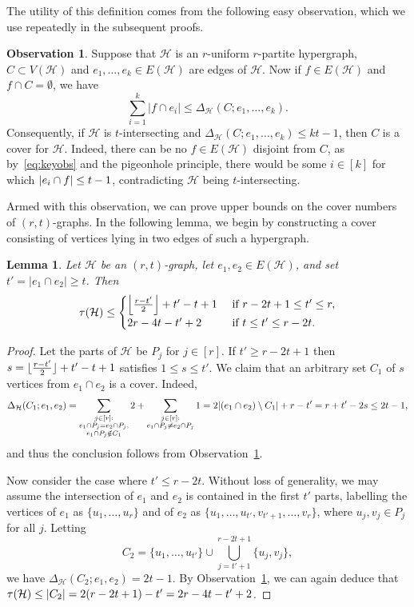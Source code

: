 \documentclass[a4paper,twoside,11pt]{article}
\DeclarePairedDelimiter{\floor}{\lfloor}{\rfloor}
\DeclarePairedDelimiter{\card}{|}{|}
\newtheorem{lem}[thm]{Lemma}
\numberwithin{thm}{section}
\theoremstyle{definition}
\newtheorem{obs}[thm]{Observation}
\theoremstyle{remark}
\theoremstyle{definition}
\def\cH{{\mathcal H}}
\newcommand{\m}[1]{\mathcal{#1}}
\begin{document}
The utility of this definition comes from the following easy observation, which we use repeatedly in the subsequent proofs.
\begin{obs} \label{obs:cover} Suppose that $\cH$ is an $r$-uniform $r$-partite hypergraph, $C\subset V(\cH)$ and $e_1,\ldots,e_k\in E(\cH)$ are edges of $\cH$. Now if $f\in E(\cH)$ and $f\cap C=\emptyset$, we have 
\begin{equation} \label{eq:keyobs}
    \sum_{i=1}^k|f\cap e_i|\leq \Delta_\cH(C;e_1,\ldots,e_k).
\end{equation}
Consequently, if $\cH$ is $t$-intersecting %
 and $\Delta_\cH(C;e_1,\ldots,e_k)\leq kt-1$, then $C$ is a cover for $\cH$. Indeed, there can be no $f\in E(\cH)$ disjoint from $C$, as by~\eqref{eq:keyobs} and the pigeonhole principle, there would be some $i\in[k]$ for which $\card{e_i\cap f} \leq t-1$, contradicting $\cH$ being $t$-intersecting.
\end{obs}

Armed with this observation, we can prove upper bounds on the cover numbers of $(r,t)$-graphs. In the following lemma, we begin by constructing a cover consisting of vertices lying in two edges of such a hypergraph. 

\begin{lem} \label{lem:2edges}
Let $\cH$ be an $(r,t)$-graph, let $e_1,e_2\in E(\cH)$, and set $t' = |e_1\cap e_2| \geq t$. Then 
\[\tau(\cH)\leq \begin{cases}
    \floor*{\frac{r-t'}{2}} + t'-t+1 & \mbox{ if } r-2t+1 \leq t'\leq r, \\
    2r-4t-t'+2 & \mbox{ if } t\leq t'\leq r-2t.
\end{cases} \]
\end{lem}
\begin{proof}
Let the parts of $\cH$ be $P_j$ for $j\in[r]$. If $t'\geq r-2t+1$ then $s=\floor{\frac{r-t'}{2}} + t'-t+1$ satisfies $1 \le s \le t'$. We claim that an arbitrary set $C_1$ of $s$ vertices from $e_1\cap e_2$  is a cover. Indeed,
\[\Delta_\cH(C_1;e_1,e_2)= \sum_{\substack{j\in[r]:\\e_1\cap P_j=e_2\cap P_j, \\ 
e_1\cap P_j \notin C_1}}2+ \sum_{\substack{j\in[r]:\\e_1\cap P_j\neq e_2\cap P_j}}1 =  2\card{(e_1\cap e_2)\setminus C_1}+r-t' = r + t' - 2s \leq 2t-1,\]
and thus the conclusion follows from Observation~\ref{obs:cover}.

Now consider the case where $t'\leq r-2t$.  Without loss of generality, we may assume the intersection of $e_1$ and $e_2$ is contained in the first $t'$ parts, labelling the vertices of $e_1$ as $\{u_1, \dots, u_r\}$ and of $e_2$ as $\{u_1, \dots, u_{t'}, v_{t'+1}, \dots, v_r\}$, where $u_j, v_j \in P_j$ for all $j$. 
Letting
\[ C_2 = \{u_1, \hdots, u_{t'}\} \cup \bigcup_{j = t' + 1}^{r - 2t + 1} \{u_j, v_j \},\]
we have $\Delta_{\m H}(C_2; e_1, e_2) = 2t - 1$. By Observation~\ref{obs:cover}, we can again deduce that $\tau(\m H) \le \card{C_2} = 2(r - 2t + 1) - t' = 2r - 4t - t' + 2$.
\end{proof}
\end{document}
